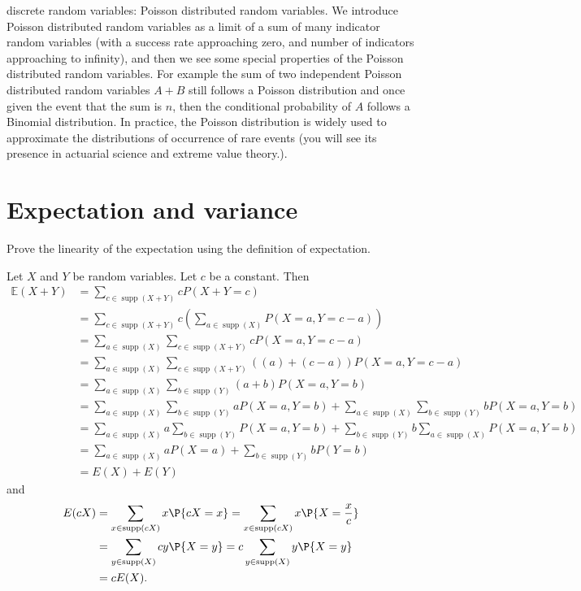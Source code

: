 discrete random variables: Poisson distributed random variables. We introduce Poisson distributed random variables as
a limit of a sum of many indicator random variables (with a success rate approaching zero, and number of indicators
approaching to infinity), and then we see some special properties of the Poisson distributed random variables. For example
the sum of two independent Poisson distributed random variables $A + B$ still follows a Poisson distribution and once given
the event that the sum is $n$, then the conditional probability of $A$ follows a Binomial distribution. In practice, the Poisson distribution is widely used
to approximate the distributions of occurrence of rare events (you will see its presence in actuarial science and extreme value
theory.).

\section{Expectation and variance}
\label{sec:section-4.1}

\begin{exercise}
	Prove the linearity of the expectation using the definition of expectation.
	\begin{solution}
		Let $X$ and $Y$ be random variables. Let $c$ be a constant. Then
		\begin{align*}
			\mathbb{E}(X+Y) & = \sum_{c\in \operatorname{supp}(X+Y)} c P(X+Y=c) \\
			&= \sum_{c\in \operatorname{supp}(X+Y)} c\left(\sum_{a \in \operatorname{supp}(X)} P(X=a, Y=c-a)\right) \\
			&= \sum_{a \in \operatorname{supp}(X)} \sum_{c\in \operatorname{supp}(X+Y)} c P(X=a, Y=c-a) \\
			&= \sum_{a \in \operatorname{supp}(X)} \sum_{c\in \operatorname{supp}(X+Y)}((a)+(c-a)) P(X=a, Y=c-a) \\
			&= \sum_{a \in \operatorname{supp}(X)} \sum_{b \in \operatorname{supp}(Y)}(a+b) P(X=a, Y=b) \\
			&= \sum_{a \in \operatorname{supp}(X)} \sum_{b \in \operatorname{supp}(Y)} a P(X=a, Y=b)+\sum_{a \in \operatorname{supp}(X)} \sum_{b \in \operatorname{supp}(Y)} b P(X=a, Y=b) \\
			&= \sum_{a \in \operatorname{supp}(X)} a \sum_{b \in \operatorname{supp}(Y)} P(X=a, Y=b)+\sum_{b \in \operatorname{supp}(Y)} b \sum_{a \in \operatorname{supp}(X)} P(X=a, Y=b) \\
			&= \sum_{a \in \operatorname{supp}(X)} a P(X=a)+\sum_{b \in \operatorname{supp}(Y)} b P(Y=b) \\
			&= E(X)+E(Y)
		\end{align*}
		and
		\begin{align*}
			E(cX) & = \sum_{x \in \text{supp}(cX)} x \P{cX = x} = \sum_{x\in \text{supp}(cX)} x \P{X = \frac{x}{c}} \\
			& = \sum_{y \in \text{supp}(X)} cy \P{X = y } = c\sum_{y \in \text{supp}(X)} y \P{X = y} \\
			& = c E(X).
		\end{align*}
	\end{solution}
\end{exercise}


